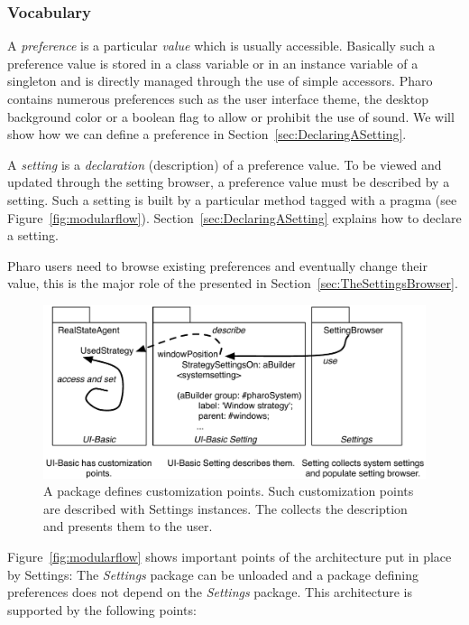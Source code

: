 \documentclass[a4paper,10pt,twoside]{book}
\begin{document}
\subsubsection{Vocabulary}
A  \emph{preference} is a particular \emph{value} which is usually accessible. Basically such a preference value is stored in a class variable or in an instance variable of a singleton and is directly managed through the use of simple accessors. Pharo contains numerous preferences such as the user interface theme, the desktop background color or a boolean flag to allow or prohibit the use of sound. We will show how we can define a preference in Section~\ref{sec:DeclaringASetting}. 

A \emph{setting} is a \emph{declaration} (description) of a preference value. To be viewed and updated through the setting browser, a preference value must be described by a setting. Such a setting is built by a particular method tagged with a pragma (see Figure~\ref{fig:modularflow}). Section~\ref{sec:DeclaringASetting} explains how to declare a setting.

Pharo users need to browse existing preferences and eventually change their value, this is the major role of the \setbrowser presented in Section~\ref{sec:TheSettingsBrowser}.

\begin{figure}[tbh]
\begin{center}
\includegraphics[scale=0.6]{modularflow}
\caption{A package defines customization points. Such customization points are described with Settings instances. The \setbrowser collects the description and presents them to the user.}
\end{center}
\end{figure}

Figure~\ref{fig:modularflow} shows important points of the architecture put in place by Settings: The \emph{Settings} package can be unloaded and a package defining preferences does not depend on the \emph{Settings} package. This architecture is supported by the following points:
\end{document}
